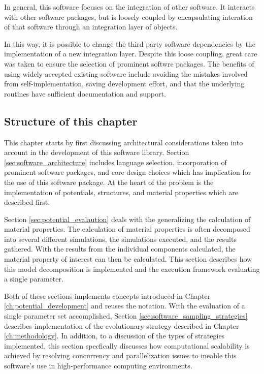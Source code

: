 In general, this software focuses on the integration of other software.  It interacts with other software packages, but is loosely coupled by encapsulating interation of that software through an integration layer of objects.

In this way, it is possible to change the third party software dependencies by the implementation of a new integration layer.  Despite this loose coupling, great care was taken to ensure the selection of prominent softwre packages.  The benefits of using widely-accepted existing software include avoiding the mistakes involved from self-implementation, saving development effort, and that the underlying routines have sufficient documentation and support.


\subsection{Structure of this chapter}

This chapter starts by first discussing architectural considerations taken into account in the development of this software library.  Section \ref{sec:software_architecture} includes language selection, incorporation of prominent software packages, and core design choices which has implication for the use of this software package.  At the heart of the problem is the implementation of potentials, structures, and material properties which are described first.

Section \ref{sec:potential_evalaution} deals with the generalizing the calculation of material properties.  The calculation of material properties is often decomposed into several different simulations, the simulations executed, and the results gathered.  With the results from the individual components calculated, the material property of interest can then be calculated.  This section describes how this model decomposition is implemented and the execution framework evaluating a single parameter.

Both of these sections implements concepts introduced in Chapter \ref{ch:potential_development} and reuses the notation.  With the evaluation of a single parameter set accomplished, Section \ref{sec:software_sampling_strategies} describes implementation of the evolutionary strategy described in Chapter \ref{ch:methodology}.  In addition, to a discussion of the types of strategies implemented, this section specfically discusses how computational scalability is achieved by resolving concurrency and parallelization issues to ineable this software's use in high-performance computing environments.

